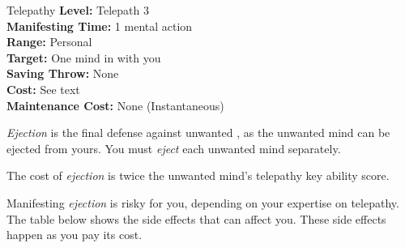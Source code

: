 {Telepathy}
{
	\textbf{Level:}
	Telepath 3\\
	\textbf{Manifesting Time:}
	1 mental action\\
	\textbf{Range:}
	Personal\\
	\textbf{Target:}
	One mind in  with you\\
	\textbf{Saving Throw:}
	None\\
	\textbf{Cost:}
	See text\\
	\textbf{Maintenance Cost:}
	None (Instantaneous)\\
}
{
	\emph{Ejection} is the final defense against unwanted , as the unwanted mind can be ejected from yours. You must \emph{eject} each unwanted mind separately.

	The cost of \emph{ejection} is twice the unwanted mind's telepathy key ability score.

	Manifesting \emph{ejection} is risky for you, depending on your expertise on telepathy. The table below shows the side effects that can affect you. These side effects happen as you pay its cost.

}

